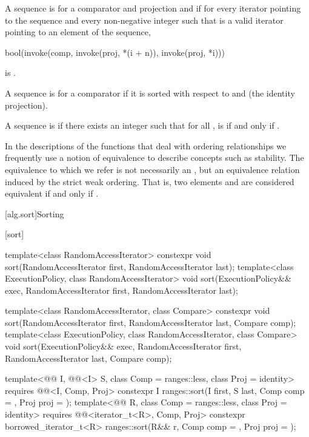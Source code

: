 \pnum
{}%
A sequence is 
for a comparator and projection  and 
if for every iterator  pointing to the sequence and
every non-negative integer 
such that  is a valid iterator
pointing to an element of the sequence,
\begin{codeblock}
bool(invoke(comp, invoke(proj, *(i + n)), invoke(proj, *i)))
\end{codeblock}
is .

\pnum
{}%
A sequence is 
for a comparator 
if it is sorted with respect to
 and  (the identity projection).

\pnum
A sequence  is
 
if there exists an integer 
such that for all ,
 is  if and only if .

\pnum
In the descriptions of the functions that deal with ordering relationships
we frequently use a notion of equivalence to describe concepts
such as stability.
The equivalence to which we refer is not necessarily an ,
but an equivalence relation induced by the strict weak ordering.
That is, two elements  and  are considered equivalent
if and only if .

[alg.sort]{Sorting}

[sort]{}

%
\begin{itemdecl}
template<class RandomAccessIterator>
  constexpr void sort(RandomAccessIterator first, RandomAccessIterator last);
template<class ExecutionPolicy, class RandomAccessIterator>
  void sort(ExecutionPolicy&& exec,
            RandomAccessIterator first, RandomAccessIterator last);

template<class RandomAccessIterator, class Compare>
  constexpr void sort(RandomAccessIterator first, RandomAccessIterator last,
                      Compare comp);
template<class ExecutionPolicy, class RandomAccessIterator, class Compare>
  void sort(ExecutionPolicy&& exec,
            RandomAccessIterator first, RandomAccessIterator last,
            Compare comp);

template<@@ I, @@<I> S, class Comp = ranges::less,
         class Proj = identity>
  requires @@<I, Comp, Proj>
  constexpr I
    ranges::sort(I first, S last, Comp comp = {}, Proj proj = {});
template<@@ R, class Comp = ranges::less, class Proj = identity>
  requires @@<iterator_t<R>, Comp, Proj>
  constexpr borrowed_iterator_t<R>
    ranges::sort(R&& r, Comp comp = {}, Proj proj = {});
\end{itemdecl}

